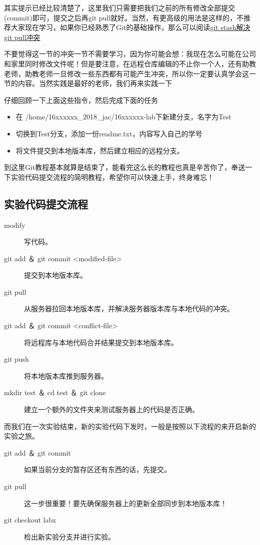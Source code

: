 其实提示已经比较清楚了，这里我们只需要把我们之前的所有修改全部提交(commit)即可，提交之后再git pull就好。当然，有更高级的用法是这样的，不推荐大家现在学习，如果你已经熟悉了Git的基础操作，那么可以阅读\href{http://www.01happy.com/git-resolve-conflicts/}{git stash解决git pull冲突}

不要觉得这一节的冲突一节不需要学习，因为你可能会想：我现在怎么可能在公司和家里同时修改文件呢！但是要注意，在远程仓库编辑的不止你一个人，还有助教老师，助教老师一旦修改一些东西都有可能产生冲突，所以你一定要认真学会这一节的内容。当然实践是最好的老师，我们再来实践一下

\begin{exercise}
仔细回顾一下上面这些指令，然后完成下面的任务
  \begin{itemize}
    \item 在 /home/16xxxxxx\_2018\_jac/16xxxxxx-lab下新建分支，名字为Test
    \item 切换到Test分支，添加一份readme.txt，内容写入自己的学号
    \item 将文件提交到本地版本库，然后建立相应的远程分支。
  \end{itemize}
\end{exercise}

到这里Git教程基本就算是结束了，能看完这么长的教程也真是辛苦你了，奉送一下实验代码提交流程的简明教程，希望你可以快速上手，终身难忘！

\subsection{实验代码提交流程}

\begin{description}
\item[modify] 写代码。
\item[git add ＆ git commit <modified-file>] 提交到本地版本库。
\item[git pull] 从服务器拉回本地版本库，并解决服务器版本库与本地代码的冲突。
\item[git add ＆ git commit <conflict-file>] 将远程库与本地代码合并结果提交到本地版本库。
\item[git push] 将本地版本库推到服务器。
\item[mkdir test ＆ cd test ＆ git clone] 建立一个额外的文件夹来测试服务器上的代码是否正确。
\end{description}

而我们在一次实验结束，新的实验代码下发时，一般是按照以下流程的来开启新的实验之旅。

\begin{description}
\item[git add ＆ git commit] 如果当前分支的暂存区还有东西的话，先提交。
\item[git pull] 这一步很重要！要先确保服务器上的更新全部同步到本地版本库！
\item[git checkout labx] 检出新实验分支并进行实验。
\end{description}

